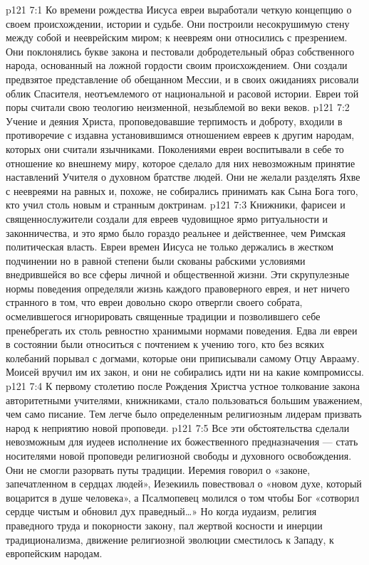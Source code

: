\vs p121 7:1 Ко времени рождества Иисуса евреи выработали четкую концепцию о своем происхождении, истории и судьбе. Они построили несокрушимую стену между собой и нееврейским миром; к неевреям они относились с презрением. Они поклонялись букве закона и пестовали добродетельный образ собственного народа, основанный на ложной гордости своим происхождением. Они создали предвзятое представление об обещанном Мессии, и в своих ожиданиях рисовали облик Спасителя, неотъемлемого от национальной и расовой истории. Евреи той поры считали свою теологию неизменной, незыблемой во веки веков.
\vs p121 7:2 Учение и деяния Христа, проповедовавшие терпимость и доброту, входили в противоречие с издавна установившимся отношением евреев к другим народам, которых они считали язычниками. Поколениями евреи воспитывали в себе то отношение ко внешнему миру, которое сделало для них невозможным принятие наставлений Учителя о духовном братстве людей. Они не желали разделять Яхве с неевреями на равных и, похоже, не собирались принимать как Сына Бога того, кто учил столь новым и странным доктринам.
\vs p121 7:3 Книжники, фарисеи и священнослужители создали для евреев чудовищное ярмо ритуальности и законничества, и это ярмо было гораздо реальнее и действеннее, чем Римская политическая власть. Евреи времен Иисуса не только держались в жестком подчинении  но в равной степени были скованы рабскими условиями  внедрившейся во все сферы личной и общественной жизни. Эти скрупулезные нормы поведения определяли жизнь каждого правоверного еврея, и нет ничего странного в том, что евреи довольно скоро отвергли своего собрата, осмелившегося игнорировать священные традиции и позволившего себе пренебрегать их столь ревностно хранимыми нормами поведения. Едва ли евреи в состоянии были относиться с почтением к учению того, кто без всяких колебаний порывал с догмами, которые они приписывали самому Отцу Аврааму. Моисей вручил им их закон, и они не собирались идти ни на какие компромиссы.
\vs p121 7:4 К первому столетию после Рождения Христча устное толкование закона авторитетными учителями, книжниками, стало пользоваться большим уважением, чем само писание. Тем легче было определенным религиозным лидерам призвать народ к неприятию новой проповеди.
\vs p121 7:5 Все эти обстоятельства сделали невозможным для иудеев исполнение их божественного предназначения --- стать носителями новой проповеди религиозной свободы и духовного освобождения. Они не смогли разорвать путы традиции. Иеремия говорил о «законе, запечатленном в сердцах людей», Иезекииль повествовал о «новом духе, который воцарится в душе человека», а Псалмопевец молился о том чтобы Бог «сотворил сердце чистым и обновил дух праведный\ldots » Но когда иудаизм, религия праведного труда и покорности закону, пал жертвой косности и инерции традиционализма, движение религиозной эволюции сместилось к Западу, к европейским народам.
